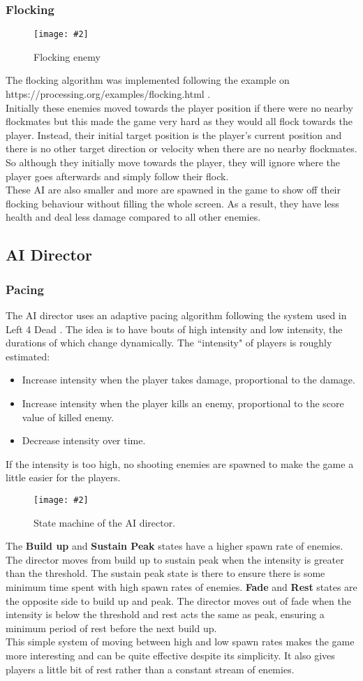 \documentclass{article}
\newcommand{\n}[0]{\\[\baselineskip]}
\newcommand{\figimg}[3]{
  \begin{figure}[H]
    \centering
    \texttt{[image: \#2]}
    \caption{#3}
  \end{figure}
  \noindent 
}
\begin{document}
\subsubsection{Flocking}
\figimg{0.1}{imgs/FlockingEnemy.png}{Flocking enemy}
The flocking algorithm was implemented following the example on https://processing.org/examples/flocking.html \cite{flocking}. 
\n
Initially these enemies moved towards the player position if there were no nearby flockmates but this made the game very hard as they would all flock towards the player. Instead, their initial target position is the player's current position and there is no other target direction or velocity when there are no nearby flockmates. So although they initially move towards the player, they will ignore where the player goes afterwards and simply follow their flock.
\n
These AI are also smaller and more are spawned in the game to show off their flocking behaviour without filling the whole screen. As a result, they have less health and deal less damage compared to all other enemies.

\subsection{AI Director}
\subsubsection{Pacing}
The AI director uses an adaptive pacing algorithm following the system used in Left 4 Dead \cite{l4d}. The idea is to have bouts of high intensity and low intensity, the durations of which change dynamically. The ``intensity" of players is roughly estimated:
\begin{itemize}
\item Increase intensity when the player takes damage, proportional to the damage.
\item Increase intensity when the player kills an enemy, proportional to the score value of killed enemy.
\item Decrease intensity over time. 
\end{itemize}
\noindent
If the intensity is too high, no shooting enemies are spawned to make the game a little easier for the players.

\figimg{0.7}{imgs/DirectorFSM.png}{State machine of the AI director.}
The \textbf{Build up} and \textbf{Sustain Peak} states have a higher spawn rate of enemies. The director moves from build up to sustain peak when the intensity is greater than the threshold. The sustain peak state is there to ensure there is some minimum time spent with high spawn rates of enemies. \textbf{Fade} and \textbf{Rest} states are the opposite side to build up and peak. The director moves out of fade when the intensity is below the threshold and rest acts the same as peak, ensuring a minimum period of rest before the next build up.
\n
This simple system of moving between high and low spawn rates makes the game more interesting and can be quite effective despite its simplicity. It also gives players a little bit of rest rather than a constant stream of enemies.
\end{document}

